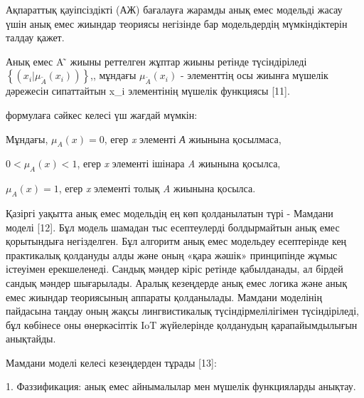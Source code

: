 Ақпараттық қауіпсіздікті (АЖ) бағалауға жарамды анық емес модельді жасау
үшін анық емес жиындар теориясы негізінде бар модельдердің
мүмкіндіктерін талдау қажет.

Анық емес A ̃ жиыны реттелген жұптар жиыны ретінде түсіндіріледі
\(\left\{ \left( x_{i}|\mu_{\widetilde{A}}(x_{i}) \right) \right\}\),,
мұндағы \(\mu_{\widetilde{A}}(x_{i})\) - элементтің осы жиынға мүшелік
дәрежесін сипаттайтын x\_i элементінің мүшелік функциясы {[}11{]}.

формулаға сәйкес келесі үш жағдай мүмкін:

% 
% 

Мұндағы, \(\mu_{A}(x) = 0\), егер \emph{x} элементі \emph{А} жиынына
қосылмаса,

\(0 < \mu_{A}(x) < 1\), егер \emph{x} элементі ішінара \emph{A} жиынына
қосылса,

\(\mu_{A}(x) = 1\), егер \emph{x} элементі толық \emph{A} жиынына
қосылса.

Қазіргі уақытта анық емес модельдің ең көп қолданылатын түрі - Мамдани
моделі {[}12{]}. Бұл модель шамадан тыс есептеулерді болдырмайтын анық
емес қорытындыға негізделген. Бұл алгоритм анық емес модельдеу
есептерінде кең практикалық қолдануды алды және оның «қара жәшік»
принципінде жұмыс істеуімен ерекшеленеді. Сандық мәндер кіріс ретінде
қабылданады, ал бірдей сандық мәндер шығарылады. Аралық кезеңдерде анық
емес логика және анық емес жиындар теориясының аппараты қолданылады.
Мамдани моделінің пайдасына таңдау оның жақсы лингвистикалық
түсіндірмелілігімен түсіндіріледі, бұл көбінесе оны өнеркәсіптік IoT
жүйелерінде қолданудың қарапайымдылығын анықтайды.

Мамдани моделі келесі кезеңдерден тұрады {[}13{]}:

1. Фаззификация: анық емес айнымалылар мен мүшелік функцияларды анықтау.

